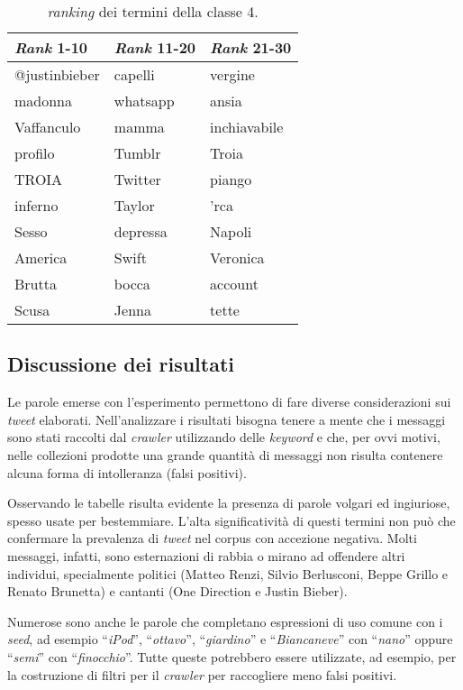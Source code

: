 \begin{table}[ht]
\centering
\begin{tabular}{|l|l|l|}
\hline
\textit{Rank} 1-10     & \textit{Rank} 11-20 & \textit{Rank} 21-30   \\ \hline
@justinbieber & capelli    & vergine \\
madonna       & whatsapp   & ansia        \\
Vaffanculo    & mamma      & inchiavabile \\
profilo       & Tumblr     & Troia        \\
TROIA         & Twitter    & piango       \\
inferno       & Taylor     & 'rca         \\
Sesso         & depressa   & Napoli       \\
America       & Swift      & Veronica     \\
Brutta        & bocca      & account      \\
Scusa         & Jenna      & tette        \\ \hline
\end{tabular}
\caption{\textit{ranking} dei termini della classe 4.}
\label{rankclass4}
\end{table}


\subsection{Discussione dei risultati}

Le parole emerse con l'esperimento permettono di fare diverse considerazioni sui \textit{tweet} elaborati.
Nell'analizzare i risultati bisogna tenere a mente che i messaggi sono stati raccolti dal \textit{crawler} utilizzando delle \textit{keyword} e che, per ovvi motivi, nelle collezioni
prodotte una grande quantità di messaggi non risulta contenere alcuna forma di intolleranza (falsi positivi).

Osservando le tabelle risulta evidente la presenza di parole volgari ed ingiuriose, spesso usate per bestemmiare. L'alta significatività di questi termini non può che confermare la prevalenza di 
\textit{tweet} nel corpus con accezione negativa. Molti messaggi, infatti, sono esternazioni di rabbia o mirano ad offendere altri individui, specialmente politici (Matteo Renzi, Silvio Berlusconi,
Beppe Grillo e Renato Brunetta) e cantanti (One Direction e Justin Bieber).

Numerose sono anche le parole che completano espressioni di uso comune con i \textit{seed}, ad esempio ``\textit{iPod}'', ``\textit{ottavo}'', ``\textit{giardino}'' e ``\textit{Biancaneve}'' con ``\textit{nano}'' 
oppure ``\textit{semi}'' con ``\textit{finocchio}''.
Tutte queste potrebbero essere utilizzate, ad esempio, per la costruzione di filtri per il \textit{crawler} per raccogliere meno falsi positivi.

